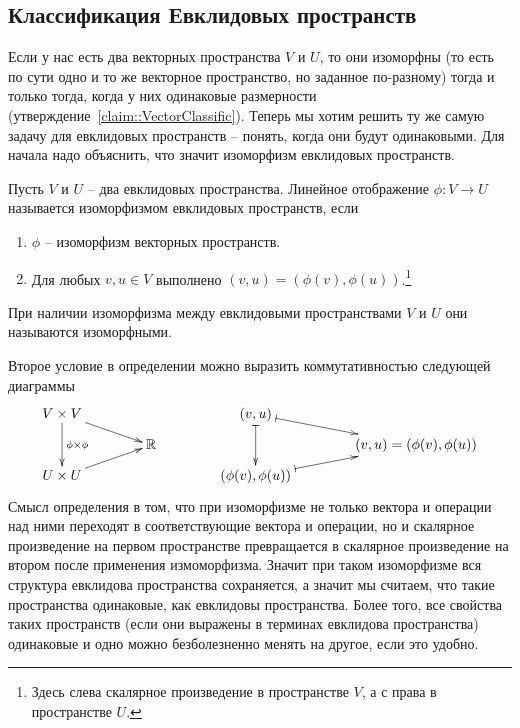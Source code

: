 \subsection{Классификация Евклидовых пространств}

Если у нас есть два векторных пространства $V$ и $U$, то они изоморфны (то есть по сути одно и то же векторное пространство, но заданное по-разному) тогда и только тогда, когда у них одинаковые размерности (утверждение~\ref{claim::VectorClassific}). Теперь мы хотим решить ту же самую задачу для евклидовых пространств -- понять, когда они будут одинаковыми. Для начала надо объяснить, что значит изоморфизм евклидовых пространств.

\begin{definition}
Пусть $V$ и $U$ -- два евклидовых пространства. Линейное отображение $\phi\colon V\to U$ называется изоморфизмом евклидовых пространств, если
\begin{enumerate}
\item $\phi$ -- изоморфизм векторных пространств.
\item Для любых $v,u\in V$ выполнено $(v, u) = (\phi(v), \phi(u))$.\footnote{Здесь слева скалярное произведение в пространстве $V$, а с права в пространстве $U$.}
\end{enumerate}
При наличии изоморфизма между евклидовыми пространствами $V$ и $U$ они называются изоморфными.
\end{definition}

Второе условие в определении можно выразить коммутативностью следующей диаграммы
\[
\xymatrix@R=6pt@C=40pt{
	{V\times V}\ar[dd]^{\phi\times \phi}\ar[rd]&{}&{(v,u)}\ar@{|->}[dd]\ar@{|->}[rd]&{}\\
	{}&{\mathbb R}&{}&{(v,u) = (\phi(v),\phi(u))}\\
	{U\times U}\ar[ru]&{}&{(\phi(v),\phi(u))}\ar@{|->}[ru]&{}
}
\]
Смысл определения в том, что при изоморфизме не только вектора и операции над ними переходят в соответствующие вектора и операции, но и скалярное произведение на первом пространстве превращается в скалярное произведение на втором после применения измоморфизма. Значит при таком изоморфизме вся структура евклидова пространства сохраняется, а значит мы считаем, что такие пространства одинаковые, как евклидовы пространства. Более того, все свойства таких пространств (если они выражены в терминах евклидова пространства) одинаковые и одно можно безболезненно менять на другое, если это удобно.



